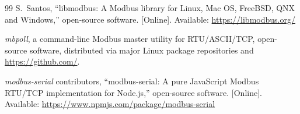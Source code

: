 \documentclass[10pt,conference]{IEEEtran}
\begin{document}
\begin{thebibliography}{99}
S.~Santos, ``libmodbus: A Modbus library for Linux, Mac OS, FreeBSD,
QNX and Windows,'' open-source software. [Online]. Available:
\url{https://libmodbus.org/}

\emph{mbpoll}, a command-line Modbus master utility for RTU/ASCII/TCP,
open-source software, distributed via major Linux package repositories
and \url{https://github.com/}.

\emph{modbus-serial} contributors, ``modbus-serial: A pure JavaScript
Modbus RTU/TCP implementation for Node.js,'' open-source software.
[Online]. Available: \url{https://www.npmjs.com/package/modbus-serial}

\end{thebibliography}
\end{document}
